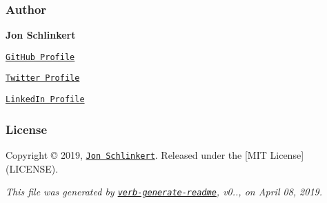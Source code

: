 \subsubsection*{Author}

{\bfseries Jon Schlinkert}


\begin{DoxyItemize}
\item \href{https://github.com/jonschlinkert}{\tt Git\+Hub Profile}
\item \href{https://twitter.com/jonschlinkert}{\tt Twitter Profile}
\item \href{https://linkedin.com/in/jonschlinkert}{\tt Linked\+In Profile}
\end{DoxyItemize}

\subsubsection*{License}

Copyright © 2019, \href{https://github.com/jonschlinkert}{\tt Jon Schlinkert}. Released under the \mbox{[}M\+IT License\mbox{]}(L\+I\+C\+E\+N\+SE).





{\itshape This file was generated by \href{https://github.com/verbose/verb-generate-readme}{\tt verb-\/generate-\/readme}, v0.., on April 08, 2019.} 